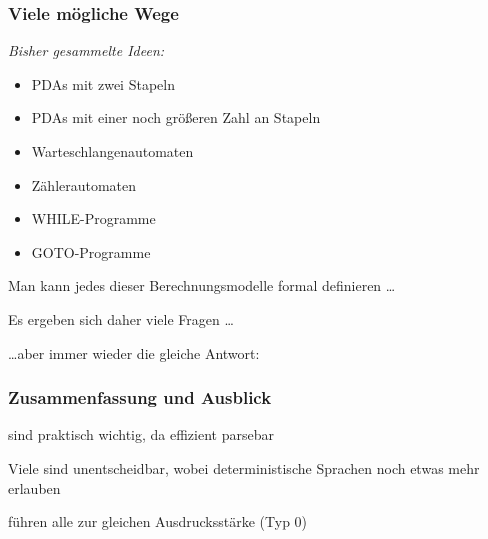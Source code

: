 \documentclass[aspectratio=1610,onlymath]{beamer}
\begin{document}
\begin{frame}\frametitle{Viele mögliche Wege}

\emph{Bisher gesammelte Ideen:}
\begin{itemize}
\item PDAs mit zwei Stapeln
\item PDAs mit einer noch größeren Zahl an Stapeln
\item Warteschlangenautomaten
\item Zählerautomaten
\item WHILE-Programme
\item GOTO-Programme
\end{itemize}

Man kann jedes dieser Berechnungsmodelle formal definieren \ldots\medskip\pause

Es ergeben sich daher viele Fragen \ldots

\pause

\ldots aber immer wieder die gleiche Antwort\pause:\\[1ex]
\narrowcentering{{\Large\textcolor{purple}{Genau die Typ-0-Sprachen.}}}



\end{frame}

\begin{frame}\frametitle{Zusammenfassung und Ausblick}

 sind praktisch wichtig, da effizient parsebar 
\bigskip

Viele  sind unentscheidbar, wobei deterministische Sprachen noch etwas mehr erlauben
\bigskip

 führen alle zur gleichen Ausdrucksstärke (Typ 0)
\bigskip


\end{frame}
\end{document}
